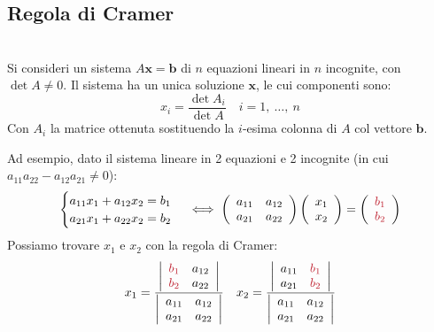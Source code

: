 \subsection{Regola di Cramer}\label{Cramerrimembriancor}
\begin{theorema}~{}\\
	Si consideri un sistema $A\mathbf{x}=\mathbf{b}$ di $n$ equazioni lineari in $n$ incognite, con $\det A \neq 0$. Il sistema ha un unica soluzione $\mathbf{x}$, le cui componenti sono:
	\begin{equation}
		x_i=\frac{\det A_i}{\det A}\quad i=1,\ \ldots,\ n
	\end{equation}
	Con $A_i$ la matrice ottenuta sostituendo la $i$-esima colonna di $A$ col vettore $\mathbf{b}$.
\end{theorema}
Ad esempio, dato il sistema lineare in 2 equazioni e 2 incognite (in cui $a_{11}a_{22}-a_{12}a_{21}\neq 0$):
\begin{equation*}
	\begin{cases}
		a_{11}x_1+a_{12}x_2=b_1\\
		a_{21}x_1+a_{22}x_2=b_2
	\end{cases}\iff
\left(\begin{array}{cc}
	a_{11} & a_{12} \\
	a_{21} & a_{22}
\end{array}\right)\left(\begin{array}{c}
x_1 \\
x_2
\end{array}\right)=\left(\begin{array}{c}
\textcolor{redill}{b_1} \\
\textcolor{redill}{b_2}
\end{array}\right)
\end{equation*}
Possiamo trovare $x_1$ e $x_2$ con la regola di Cramer:
\begin{equation*}
	x_1=\frac{\left|\begin{array}{cc}
			\textcolor{redill}{b_1} & a_{12} \\
			\textcolor{redill}{b_2} & a_{22}
		\end{array}\right|}{\left|\begin{array}{cc}
		a_{11} & a_{12} \\
		a_{21} & a_{22}
	\end{array}\right|}\quad x_2=\frac{\left|\begin{array}{cc}
	 a_{11} & \textcolor{redill}{b_1} \\
	 a_{21} & \textcolor{redill}{b_2}
\end{array}\right|}{\left|\begin{array}{cc}
a_{11} & a_{12} \\
a_{21} & a_{22}
\end{array}\right|}
\end{equation*}